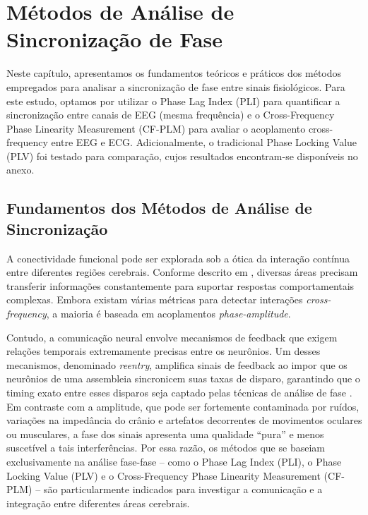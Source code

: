 \chapter{Métodos de Análise de Sincronização de Fase}
\label{chap:6_metodos_de_analise_de_sincronizacao_de_fase}

Neste capítulo, apresentamos os fundamentos teóricos e práticos dos métodos empregados para analisar a sincronização de fase entre sinais fisiológicos. Para este estudo, optamos por utilizar o Phase Lag Index (PLI) para quantificar a sincronização entre canais de EEG (mesma frequência) e o Cross-Frequency Phase Linearity Measurement (CF-PLM) para avaliar o acoplamento cross-frequency entre EEG e ECG. Adicionalmente, o tradicional Phase Locking Value (PLV) foi testado para comparação, cujos resultados encontram-se disponíveis no anexo.

\section{Fundamentos dos Métodos de Análise de Sincronização}

A conectividade funcional pode ser explorada sob a ótica da interação contínua entre diferentes regiões cerebrais. Conforme descrito em \cite{sorrentino2022detection}, diversas áreas precisam transferir informações constantemente para suportar respostas comportamentais complexas. Embora existam várias métricas para detectar interações \textit{cross-frequency}, a maioria é baseada em acoplamentos \textit{phase-amplitude}.

Contudo, a comunicação neural envolve mecanismos de feedback que exigem relações temporais extremamente precisas entre os neurônios. Um desses mecanismos, denominado \emph{reentry}, amplifica sinais de feedback ao impor que os neurônios de uma assembleia sincronicem suas taxas de disparo, garantindo que o timing exato entre esses disparos seja captado pelas técnicas de análise de fase \cite{seraj2018cerebral, ren2022multi}. Em contraste com a amplitude, que pode ser fortemente contaminada por ruídos, variações na impedância do crânio e artefatos decorrentes de movimentos oculares ou musculares, a fase dos sinais apresenta uma qualidade “pura” e menos suscetível a tais interferências. Por essa razão, os métodos que se baseiam exclusivamente na análise fase-fase – como o Phase Lag Index (PLI), o Phase Locking Value (PLV) e o Cross-Frequency Phase Linearity Measurement (CF-PLM) – são particularmente indicados para investigar a comunicação e a integração entre diferentes áreas cerebrais.

